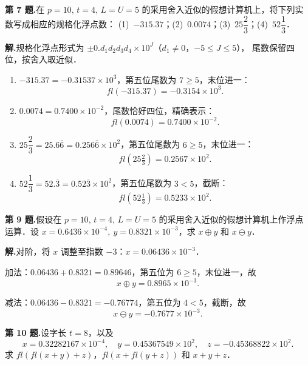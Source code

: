 \documentclass[UTF8,a4paper,11pt]{ctexart}
\begin{document}
\bigskip\bigskip

\noindent\textbf{第 7 题.}\quad 在 $p=10,\,t=4,\,L=U=5$ 的采用舍入近似的假想计算机上，将下列实数写成相应的规格化浮点数：
(1)~$-315.37$；\quad (2)~$0.0074$；\quad (3)~$25\dfrac{2}{3}$；\quad (4)~$52\dfrac{1}{3}$．

\medskip
\noindent\textbf{解.}\quad 规格化浮点形式为 $\pm 0.d_1 d_2 d_3 d_4\times 10^J$（$d_1\neq 0$，$-5\leqslant J\leqslant 5$），
尾数保留四位，按舍入取近似．

\begin{enumerate}[label=(\arabic*),leftmargin=*,itemsep=4pt]
  \item $-315.37 = -0.31537\times 10^3$，第五位尾数为 $7\geqslant 5$，末位进一：
        \[
          fl(-315.37) = -0.3154\times 10^3.
        \]

  \item $0.0074 = 0.7400\times 10^{-2}$，尾数恰好四位，精确表示：
        \[
          fl(0.0074) = 0.7400\times 10^{-2}.
        \]

  \item $25\dfrac{2}{3} = 25.6\overline{6} = 0.256\overline{6}\times 10^2$，第五位尾数为 $6\geqslant 5$，末位进一：
        \[
          fl\!\left(25\tfrac{2}{3}\right) = 0.2567\times 10^2.
        \]

  \item $52\dfrac{1}{3} = 52.\overline{3} = 0.52\overline{3}\times 10^2$，第五位尾数为 $3<5$，截断：
        \[
          fl\!\left(52\tfrac{1}{3}\right) = 0.5233\times 10^2.
        \]
\end{enumerate}

\bigskip\bigskip

\noindent\textbf{第 9 题.}\quad 假设在 $p=10,\,t=4,\,L=U=5$ 的采用舍入近似的假想计算机上作浮点运算．设
$x = 0.6436\times 10^{-4},\ y = 0.8321\times 10^{-3}$，求 $x\oplus y$ 和 $x\ominus y$．

\medskip
\noindent\textbf{解.}\quad 对阶，将 $x$ 调整至指数 $-3$：$x = 0.06436\times 10^{-3}$．

加法：$0.06436 + 0.8321 = 0.89646$，第五位为 $6\geqslant 5$，末位进一，故
\[
  x\oplus y = 0.8965\times 10^{-3}.
\]

减法：$0.06436 - 0.8321 = -0.76774$，第五位为 $4<5$，截断，故
\[
  x\ominus y = -0.7677\times 10^{-3}.
\]

\bigskip\bigskip

\noindent\textbf{第 10 题.}\quad 设字长 $t=8$，以及
\[
  x = 0.32282167\times 10^{-4},\quad
  y = 0.45367549\times 10^{2},\quad
  z = -0.45368822\times 10^{2}.
\]
求 $fl(fl(x+y)+z)$，$fl(x+fl(y+z))$ 和 $x+y+z$．
\end{document}
